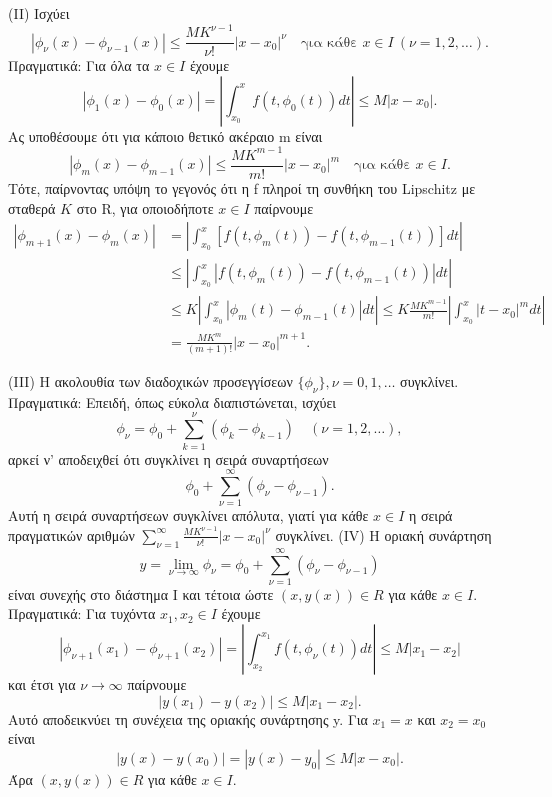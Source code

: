 \documentclass[11pt,a4paper,twoside]{book}
\begin{document}
(II) Ισχύει
\[
|\phi_{\nu}(x)-\phi_{\nu-1}(x)| \le \frac{M K^{\nu-1}}{\nu!}|x-x_0|^{\nu} \quad \text{για κάθε } x \in I \ (\nu=1,2,\dots).
\]
Πραγματικά: Για όλα τα $x \in I$ έχουμε
\[
|\phi_1(x) - \phi_0(x)| = \left|\int_{x_0}^x f(t,\phi_0(t))dt\right| \le M|x-x_0|.
\]
Ας υποθέσουμε ότι για κάποιο θετικό ακέραιο m είναι
\[
|\phi_m(x) - \phi_{m-1}(x)| \le \frac{M K^{m-1}}{m!}|x-x_0|^m \quad \text{για κάθε } x \in I.
\]
Τότε, παίρνοντας υπόψη το γεγονός ότι η f πληροί τη συνθήκη του Lipschitz με σταθερά $K$ στο R, για οποιοδήποτε $x \in I$ παίρνουμε
\begin{align*}
|\phi_{m+1}(x) - \phi_m(x)| &= \left| \int_{x_0}^x [f(t, \phi_m(t)) - f(t, \phi_{m-1}(t))] dt \right| \\
&\le \left| \int_{x_0}^x |f(t, \phi_m(t)) - f(t, \phi_{m-1}(t))| dt \right| \\
&\le K \left| \int_{x_0}^x |\phi_m(t) - \phi_{m-1}(t)| dt \right| \le K \frac{M K^{m-1}}{m!} \left| \int_{x_0}^x |t-x_0|^m dt \right| \\
&= \frac{M K^m}{(m+1)!}|x-x_0|^{m+1}.
\end{align*}

(III) Η ακολουθία των διαδοχικών προσεγγίσεων $\{\phi_\nu\}, \nu=0,1,\dots$ συγκλίνει. Πραγματικά: Επειδή, όπως εύκολα διαπιστώνεται, ισχύει
\[
\phi_\nu = \phi_0 + \sum_{k=1}^\nu (\phi_k - \phi_{k-1}) \quad (\nu=1,2,\dots),
\]
αρκεί ν' αποδειχθεί ότι συγκλίνει η σειρά συναρτήσεων
\[
\phi_0 + \sum_{\nu=1}^\infty (\phi_\nu - \phi_{\nu-1}).
\]
Αυτή η σειρά συναρτήσεων συγκλίνει απόλυτα, γιατί για κάθε $x \in I$ η σειρά πραγματικών αριθμών $\sum_{\nu=1}^\infty \frac{M K^{\nu-1}}{\nu!}|x-x_0|^\nu$ συγκλίνει.
\newline
\newline
(IV) Η οριακή συνάρτηση
\[
y = \lim_{\nu \to \infty} \phi_\nu = \phi_0 + \sum_{\nu=1}^\infty (\phi_\nu - \phi_{\nu-1})
\]
είναι συνεχής στο διάστημα Ι και τέτοια ώστε $(x,y(x)) \in R$ για κάθε $x \in I$. Πραγματικά: Για τυχόντα $x_1, x_2 \in I$ έχουμε
\[
|\phi_{\nu+1}(x_1) - \phi_{\nu+1}(x_2)| = \left|\int_{x_2}^{x_1} f(t, \phi_\nu(t)) dt\right| \le M|x_1-x_2|
\]
και έτσι για $\nu \to \infty$ παίρνουμε
\[
|y(x_1)-y(x_2)| \le M|x_1-x_2|.
\]
Αυτό αποδεικνύει τη συνέχεια της οριακής συνάρτησης y. Για $x_1=x$ και $x_2=x_0$ είναι
\[
|y(x)-y(x_0)| = |y(x)-y_0| \le M|x-x_0|.
\]
Άρα $(x,y(x)) \in R$ για κάθε $x \in I$.
\end{document}

